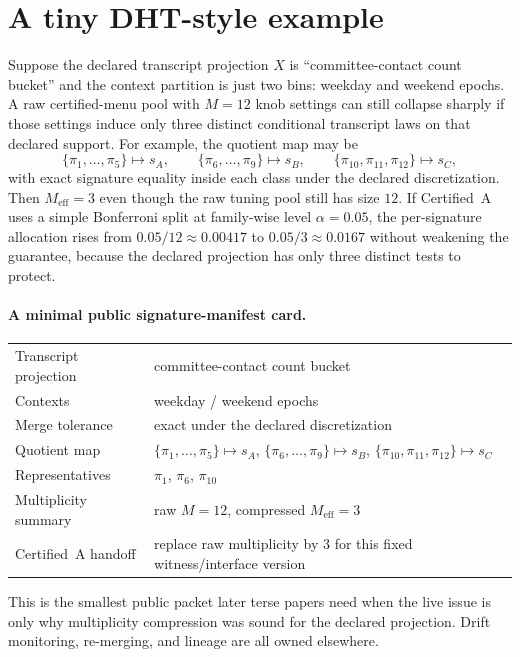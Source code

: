\documentclass[11pt]{article}
\begin{document}
\section{A tiny DHT-style example}
Suppose the declared transcript projection $X$ is ``committee-contact count bucket'' and the context partition is just two bins: weekday and weekend epochs.
A raw certified-menu pool with $M=12$ knob settings can still collapse sharply if those settings induce only three distinct conditional transcript laws on that declared support.
For example, the quotient map may be
\[
\{\pi_1,\ldots,\pi_5\}\mapsto s_A,\qquad
\{\pi_6,\ldots,\pi_9\}\mapsto s_B,\qquad
\{\pi_{10},\pi_{11},\pi_{12}\}\mapsto s_C,
\]
with exact signature equality inside each class under the declared discretization.
Then $M_{\mathrm{eff}}=3$ even though the raw tuning pool still has size $12$.
If Certified~A uses a simple Bonferroni split at family-wise level $\alpha=0.05$, the per-signature allocation rises from $0.05/12\approx 0.00417$ to $0.05/3\approx 0.0167$ without weakening the guarantee, because the declared projection has only three distinct tests to protect.

\paragraph{A minimal public signature-manifest card.}
\begin{center}\small
\begin{tabular}{@{}ll@{}}
Transcript projection & committee-contact count bucket \\
Contexts & weekday / weekend epochs \\
Merge tolerance & exact under the declared discretization \\
Quotient map & $\{\pi_1,\ldots,\pi_5\}\mapsto s_A$, $\{\pi_6,\ldots,\pi_9\}\mapsto s_B$, $\{\pi_{10},\pi_{11},\pi_{12}\}\mapsto s_C$ \\
Representatives & $\pi_1$, $\pi_6$, $\pi_{10}$ \\
Multiplicity summary & raw $M=12$, compressed $M_{\mathrm{eff}}=3$ \\
Certified~A handoff & replace raw multiplicity by $3$ for this fixed witness/interface version \\
\end{tabular}
\end{center}
This is the smallest public packet later terse papers need when the live issue is only why multiplicity compression was sound for the declared projection. Drift monitoring, re-merging, and lineage are all owned elsewhere.
\end{document}
